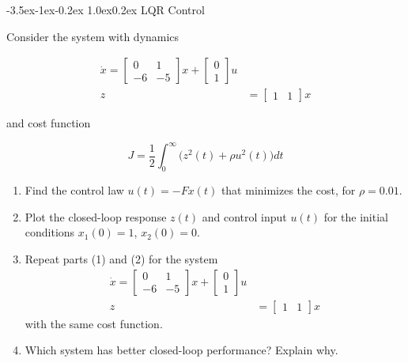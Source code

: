 \documentclass[11pt,letterpaper,onecolumn,notitlepage]{article}
\makeatletter
\renewcommand\section{\@startsection{section}{1}{\z@}%
{-3.5ex\@plus-1ex\@minus-0.2ex}%
{1.0ex\@plus0.2ex}%
{\fontsize{12pt}{12pt}\selectfont\bfseries\sffamily}}
\makeatother
\begin{document}
\clearpage
\section{LQR Control}

Consider the system with dynamics

\begin{align*}
  \dot{x}=
  \begin{bmatrix}
    0 & 1 \\
    -6 & -5
  \end{bmatrix}
  x+
  \begin{bmatrix}
    0 \\
    1
  \end{bmatrix}
  u \\
  z&=
  \begin{bmatrix}
    1 & 1
  \end{bmatrix}x
\end{align*}

and cost function

\begin{equation*}
  J=\frac{1}{2}\int_{0}^{\infty}\bigr(z^{2}(t)+\rho u^{2}(t)\bigr)dt
\end{equation*}

\begin{enumerate}
  \item{Find the control law $u(t)=-Fx(t)$ that minimizes the cost, for $\rho=0.01$.}
  \item{Plot the closed-loop response $z(t)$ and control input $u(t)$ for the initial conditions $x_{1}(0)=1$, $x_{2}(0)=0$.}
  \item{Repeat parts (1) and (2) for the system}
  \begin{align*}
    \dot{x}=
    \begin{bmatrix}
      0 & 1 \\
      -6 & -5
    \end{bmatrix}
    x+
    \begin{bmatrix}
      0 \\
      1
    \end{bmatrix}
    u \\
    z&=
    \begin{bmatrix}
      1 & 1
    \end{bmatrix}x
  \end{align*}
  with the same cost function.
  \item{Which system has better closed-loop performance? Explain why.}
\end{enumerate}
\end{document}
